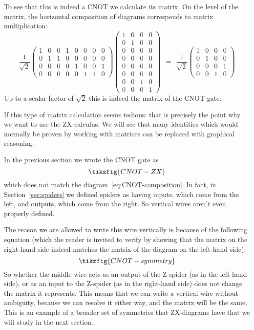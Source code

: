 \documentclass[a4paper,onecolumn,superscriptaddress,11pt,%
				unpublished,%
				allowfontchageintitle,%
				]{quantumarticle}
\begin{document}
To see that this is indeed a CNOT we calculate its matrix.
On the level of the matrix, the horizontal composition of diagrams corresponds to matrix multiplication:
\[\frac{1}{\sqrt{2}}\begin{pmatrix}1&0&0&1&0&0&0&0\\0&1&1&0&0&0&0&0\\0&0&0&0&1&0&0&1\\0&0&0&0&0&1&1&0\end{pmatrix} \begin{pmatrix}1&0&0&0\\0&1&0&0\\0&0&0&0\\0&0&0&0\\0&0&0&0\\0&0&0&0\\0&0&1&0\\0&0&0&1\end{pmatrix}
\ \ = \ \ \frac{1}{\sqrt{2}}\begin{pmatrix}1&0&0&0\\0&1&0&0\\0&0&0&1\\0&0&1&0 \end{pmatrix}\]
Up to a scalar factor of $\sqrt{2}$ this is indeed the matrix of the CNOT gate.

If this type of matrix calculation seems tedious: that is precisely the point why we want to use the ZX-calculus. 
We will see that many identities which would normally be proven by working with matrices can be replaced with graphical reasoning.

In the previous section we wrote the CNOT gate as 
\begin{equation}
\tikzfig{CNOT-ZX}
\end{equation}
which does not match the diagram~\eqref{eq:CNOT-composition}. In fact, in Section~\ref{sec:spiders} we defined spiders as having inputs, which come from the left, and outputs, which come from the right. So vertical wires aren't even properly defined.

The reason we are allowed to write this wire vertically is because of the following equation (which the reader is invited to verify by showing that the matrix on the right-hand side indeed matches the matrix of the diagram on the left-hand side): 
\begin{equation}
\tikzfig{CNOT-symmetry}
\end{equation}
So whether the middle wire acts as an output of the Z-spider (as in the left-hand side), or as an input to the Z-spider (as in the right-hand side) does not change the matrix it represents. This means that we can write a vertical wire without ambiguity, because we can resolve it either way, and the matrix will be the same.
This is an example of a broader set of symmetries that ZX-diagrams have that we will study in the next section.
\end{document}
